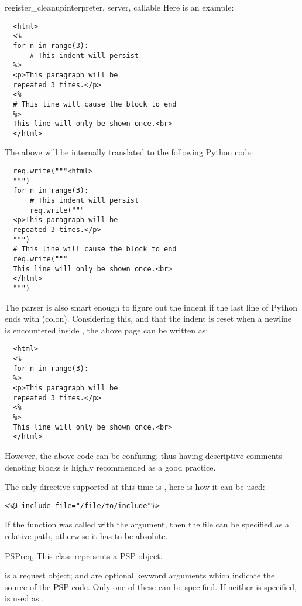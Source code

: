 \begin{funcdesc}{register_cleanup}{interpreter, server, callable}
Here is an example:
\begin{verbatim}
  <html>
  <%
  for n in range(3):
      # This indent will persist
  %>
  <p>This paragraph will be 
  repeated 3 times.</p>
  <%
  # This line will cause the block to end
  %>
  This line will only be shown once.<br>
  </html>
\end{verbatim}

The above will be internally translated to the following Python code:

\begin{verbatim}
  req.write("""<html>
  """)
  for n in range(3):
      # This indent will persist
      req.write("""
  <p>This paragraph will be
  repeated 3 times.</p>
  """)
  # This line will cause the block to end
  req.write("""
  This line will only be shown once.<br>
  </html>
  """)
\end{verbatim}

The parser is also smart enough to figure out the indent if the last
line of Python ends with \samp{:} (colon). Considering this, and that the
indent is reset when a newline is encountered inside \samp{<\% \%>}, the
above page can be written as:

\begin{verbatim}
  <html>
  <%
  for n in range(3):
  %>
  <p>This paragraph will be 
  repeated 3 times.</p>
  <%
  %>
  This line will only be shown once.<br>
  </html>
\end{verbatim}

However, the above code can be confusing, thus having descriptive
comments denoting blocks is highly recommended as a good practice.

The only directive supported at this time is , here is
how it can be used:

\begin{verbatim}
<%@ include file="/file/to/include"%>
\end{verbatim}

If the  function was called with the 
argument, then the file can be specified as a relative path, otherwise
it has to be absolute.

\begin{classdesc}{PSP}{req, }
  This class represents a PSP object.

   is a request object;  and  are
  optional keyword arguments which indicate the source of the PSP
  code. Only one of these can be specified. If neither is specified,
   is used as .


\end{classdesc}
\end{funcdesc}
